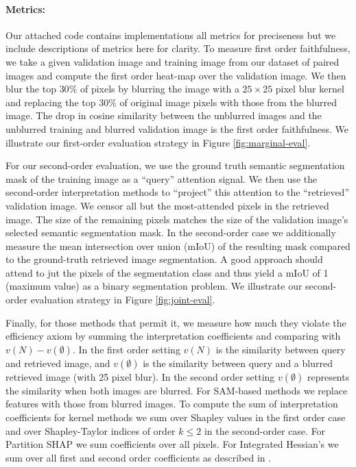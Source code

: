 \documentclass{article} %
\begin{document}
\paragraph{Metrics:} Our attached code contains implementations all metrics for preciseness but we include descriptions of metrics here for clarity. To measure first order faithfulness, we take a given validation image and training image from our dataset of paired images and compute the first order heat-map over the validation image. We then blur the top $30\%$ of pixels by blurring the image with a $25\times25$ pixel blur kernel and replacing the top $30\%$ of original image pixels with those from the blurred image. The drop in cosine similarity between the unblurred images and the unblurred training and blurred validation image is the first order faithfulness. We illustrate our first-order evaluation strategy in Figure \ref{fig:marginal-eval}.

For our second-order evaluation, we use the ground truth semantic segmentation mask of the training image as a ``query'' attention signal. We then use the second-order interpretation methods to ``project'' this attention to the ``retrieved'' validation image. We censor all but the most-attended pixels in the retrieved image. The size of the remaining pixels matches the size of the validation image's selected semantic segmentation mask. In the second-order case we additionally measure the mean intersection over union (mIoU) of the resulting mask compared to the ground-truth retrieved image segmentation. A good approach should attend to jut the pixels of the segmentation class and thus yield a mIoU of 1 (maximum value) as a binary segmentation problem. We illustrate our second-order evaluation strategy in Figure \ref{fig:joint-eval}.

Finally, for those methods that permit it, we measure how much they violate the efficiency axiom by summing the interpretation coefficients and comparing with $v(N) - v(\emptyset)$. In the first order setting $v(N)$ is the similarity between query and retrieved image, and $v(\emptyset)$ is the similarity between query and a blurred retrieved image (with 25 pixel blur). In the second order setting $v(\emptyset)$ represents the similarity when both images are blurred. For SAM-based methods we replace features with those from blurred images. To compute the sum of interpretation coefficients for kernel methods we sum over Shapley values in the first order case and over Shapley-Taylor indices of order $k \leq 2$ in the second-order case. For Partition SHAP \cite{partition-shap} we sum coefficients over all pixels. For Integrated Hessian's we sum over all first and second order coefficients as described in \cite{integrated-hessians}. 
\end{document}
